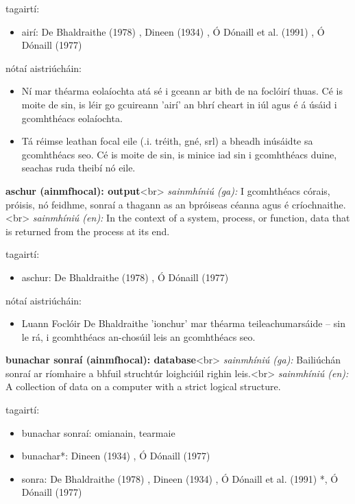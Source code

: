 \documentclass{article}
\begin{document}
tagairtí:
\begin{itemize}
	\item airí: De Bhaldraithe (1978) \cite{de-bhaldraithe}, Dineen (1934) \cite{dineen}, Ó Dónaill et al. (1991) \cite{focloir-beag}, Ó Dónaill (1977) \cite{odonaill}
\end{itemize}

nótaí aistriúcháin:
\begin{itemize}
	\item Ní mar théarma eolaíochta atá sé i gceann ar bith de na foclóirí thuas. Cé is moite de sin, is léir go gcuireann 'airí' an bhrí cheart in iúl agus é á úsáid i gcomhthéacs eolaíochta.
	\item Tá réimse leathan focal eile (.i. tréith, gné, srl) a bheadh inúsáidte sa gcomhthéacs seo. Cé is moite de sin, is minice iad sin i gcomhthéacs duine, seachas ruda theibí nó eile.
\end{itemize}


\textbf{aschur (ainmfhocal): output}<br>
\textit{sainmhíniú (ga):} I gcomhthéacs córais, próisis, nó feidhme, sonraí a thagann as an bpróiseas céanna agus é críochnaithe.<br>
\textit{sainmhíniú (en):} In the context of a system, process, or function, data that is returned from the process at its end.

tagairtí:
\begin{itemize}
	\item aschur: De Bhaldraithe (1978) \cite{de-bhaldraithe}, Ó Dónaill (1977) \cite{odonaill}
\end{itemize}

nótaí aistriúcháin:
\begin{itemize}
	\item Luann Foclóir De Bhaldraithe 'ionchur' mar théarma teileachumarsáide -- sin le rá, i gcomhthéacs an-chosúil leis an gcomhthéacs seo.
\end{itemize}


\textbf{bunachar sonraí (ainmfhocal): database}<br>
\textit{sainmhíniú (ga):} Bailiúchán sonraí ar ríomhaire a bhfuil struchtúr loighciúil righin leis.<br>
\textit{sainmhíniú (en):} A collection of data on a computer with a strict logical structure.

tagairtí:
\begin{itemize}
	\item bunachar sonraí: omianain, tearmaie
	\item bunachar*: Dineen (1934) \cite{dineen}, Ó Dónaill (1977) \cite{odonaill}
	\item sonra: De Bhaldraithe (1978) \cite{de-bhaldraithe}, Dineen (1934) \cite{dineen}, Ó Dónaill et al. (1991) \cite{focloir-beag}*, Ó Dónaill (1977) \cite{odonaill}
\end{itemize}
\end{document}
